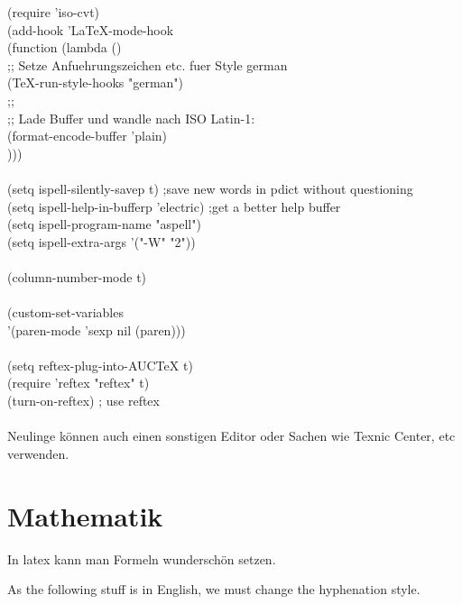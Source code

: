  (require 'iso-cvt)\\
  (add-hook 'LaTeX-mode-hook\\
    (function (lambda ()\\
      ;; Setze Anfuehrungszeichen etc. fuer Style german\\
      (TeX-run-style-hooks "german")\\
      ;;\\
      ;; Lade Buffer und wandle nach ISO Latin-1:\\
      (format-encode-buffer 'plain)\\
      )))\\
\\
      (setq ispell-silently-savep t) ;save new words in pdict without questioning\\
(setq ispell-help-in-bufferp 'electric) ;get a better help buffer\\
(setq ispell-program-name "aspell")\\
(setq ispell-extra-args '("-W" "2"))\\
\\
(column-number-mode t)\\
\\
(custom-set-variables\\
 '(paren-mode 'sexp nil (paren)))\\
\\
 (setq reftex-plug-into-AUCTeX t)\\
(require 'reftex "reftex" t)\\
 (turn-on-reftex) ; use reftex\\
\\
 


Neulinge k{\"o}nnen auch einen sonstigen Editor oder Sachen wie Texnic Center, etc verwenden.

\section{Mathematik}

In latex kann man Formeln wundersch{\"o}n setzen.

As the following stuff is in English, we must change the hyphenation style.


